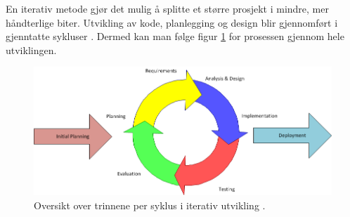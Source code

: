 En iterativ metode gjør det mulig å splitte et større prosjekt i mindre, mer håndterlige biter. Utvikling av kode, planlegging og design blir gjennomført i gjenntatte sykluser \cite{method:iterative_fig}. Dermed kan man følge figur \ref{fig:iterative_development} for prosessen gjennom hele utviklingen.

 \begin{figure}[htbp]
	\centering
		\includegraphics[scale=0.5]{Bilder/iterativ_utvikling.png}
	\caption[Iterativ Utviklings Diagram]{Oversikt over trinnene per syklus i iterativ utvikling \cite{iterative:development}. } %
	\label{fig:iterative_development}
\end{figure}


